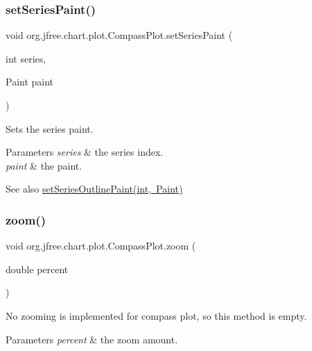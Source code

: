 \subsubsection{\texorpdfstring{set\+Series\+Paint()}{setSeriesPaint()}}
{\footnotesize\ttfamily void org.\+jfree.\+chart.\+plot.\+Compass\+Plot.\+set\+Series\+Paint (\begin{DoxyParamCaption}\item[{int}]{series,  }\item[{Paint}]{paint }\end{DoxyParamCaption})}

Sets the series paint.


\begin{DoxyParams}{Parameters}
{\em series} & the series index. \\
\hline
{\em paint} & the paint.\\
\hline
\end{DoxyParams}
\begin{DoxySeeAlso}{See also}
\mbox{\hyperlink{classorg_1_1jfree_1_1chart_1_1plot_1_1_compass_plot_a4cc92c294efa38c6f1817ac71d48def9}{set\+Series\+Outline\+Paint(int, Paint)}} 
\end{DoxySeeAlso}
\mbox{\label{classorg_1_1jfree_1_1chart_1_1plot_1_1_compass_plot_ad76cee676a42d06555facc2034629f25}} 
\subsubsection{\texorpdfstring{zoom()}{zoom()}}
{\footnotesize\ttfamily void org.\+jfree.\+chart.\+plot.\+Compass\+Plot.\+zoom (\begin{DoxyParamCaption}\item[{double}]{percent }\end{DoxyParamCaption})}

No zooming is implemented for compass plot, so this method is empty.


\begin{DoxyParams}{Parameters}
{\em percent} & the zoom amount. \\
\hline
\end{DoxyParams}


